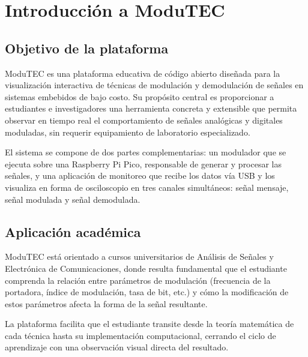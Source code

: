 \documentclass[12pt,letterpaper]{report}
\begin{document}

\tableofcontents

\clearpage



\chapter{Introducción a ModuTEC}

\section{Objetivo de la plataforma}

ModuTEC es una plataforma educativa de código abierto diseñada para la visualización
interactiva de técnicas de modulación y demodulación de señales en sistemas embebidos de
bajo costo. Su propósito central es proporcionar a estudiantes e investigadores una
herramienta concreta y extensible que permita observar en tiempo real el comportamiento
de señales analógicas y digitales moduladas, sin requerir equipamiento de laboratorio
especializado.

El sistema se compone de dos partes complementarias: un modulador que se ejecuta
sobre una Raspberry Pi Pico, responsable de generar y procesar las señales, y una aplicación
de monitoreo que recibe los datos vía USB y los visualiza en forma
de osciloscopio en tres canales simultáneos: señal mensaje, señal modulada y señal
demodulada.

\section{Aplicación académica}

ModuTEC está orientado a cursos universitarios de Análisis de Señales y 
Electrónica de Comunicaciones, donde resulta fundamental que el
estudiante comprenda la relación entre parámetros de modulación (frecuencia de la
portadora, índice de modulación, tasa de bit, etc.) y cómo la modificación de estos
parámetros afecta la forma de la señal resultante.

La plataforma facilita que el estudiante transite desde la teoría matemática de cada
técnica hasta su implementación computacional, cerrando el ciclo de aprendizaje con una
observación visual directa del resultado.
\end{document}
